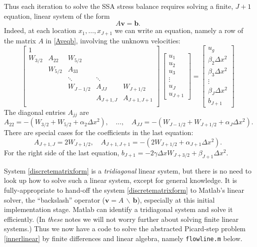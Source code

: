\documentclass[letterpaper,final,12pt,reqno]{amsart}
\begin{document}
Thus each iteration to solve the SSA stress balance requires solving a finite, $J+1$ equation, linear system of the form
\begin{equation}
   A \mathbf{v} = \mathbf{b}. \label{Aveqb}
\end{equation}
Indeed, at each location $x_1,\dots,x_{J+1}$ we can write an equation, namely a row of the matrix $A$ in \eqref{Aveqb}, involving the unknown velocities:
\begin{equation}
\begin{bmatrix}
1 &  &  &  &  \\
W_{3/2} & A_{22} & W_{5/2} &  &  \\
 & W_{5/2} & A_{33} &  &  \\
 &  & \ddots & \ddots &  \\
 &  & W_{J-1/2} & A_{JJ} & W_{J+1/2} \\
 &  &  & A_{J+1,J} & A_{J+1,J+1} \\
\end{bmatrix}\,
\begin{bmatrix}
u_1 \\ u_2 \\ u_3 \\ \vdots \\ u_J \\ u_{J+1}
\end{bmatrix}
=
\begin{bmatrix}
u_g \\ \beta_2 \Delta x^2 \\ \beta_3 \Delta x^2 \\ \vdots \\ \beta_J \Delta x^2 \\ b_{J+1}
\end{bmatrix}  \label{discretematrixform}
\end{equation}
The diagonal entries $A_{jj}$ are
  $$A_{22} = -(W_{3/2}+W_{5/2}+\alpha_2 \Delta x^2), \quad \dots, \quad A_{JJ} = -(W_{J-1/2}+W_{J+1/2}+\alpha_J \Delta x^2).$$
There are special cases for the coefficients in the last equation:
  $$A_{J+1,J} = 2 W_{J+1/2}, \quad A_{J+1,J+1} = -(2 W_{J+1/2}+\alpha_{J+1}\Delta x^2).$$
For the right side of the last equation, $b_{J+1} = -2 \gamma \Delta x W_{J+3/2} + \beta_{J+1} \Delta x^2$.

System \eqref{discretematrixform} is a \emph{tridiagonal} linear system, but there is no need to look up how to solve such a linear system, except for general knowledge.  It is fully-appropriate to hand-off the system \eqref{discretematrixform} to Matlab's linear solver, the ``backslash'' operator ($\mathbf{v} = A\, \backslash\, \mathbf{b}$), especially at this initial implementation stage.  Matlab can identify a tridiagonal system and solve it efficiently.  (In \emph{these} notes we will not worry further about solving finite linear systems.)  Thus we now have a code to solve the abstracted Picard-step problem \eqref{innerlinear} by finite differences and linear algebra, namely \texttt{flowline.m} below.
\end{document}
